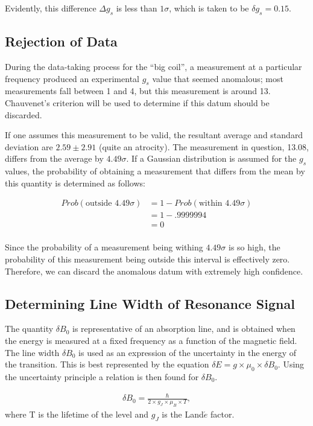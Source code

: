 \documentclass[a4paper]{article}
\begin{document}
Evidently, this difference $\Delta g_s$ is less than $1 \sigma$, which is taken to be $\delta g_s = 0.15$.

\subsection{Rejection of Data}
\qq During the data-taking process for the ``big coil'', a measurement
at a particular frequency produced an experimental $g_s$ value that
seemed anomalous; most measurements fall between 1 and 4, but this
measurement is around 13. Chauvenet's criterion will be used to
determine if this datum should be discarded.

\qq If one assumes this measurement to be valid, the resultant average
and standard deviation are $2.59 \pm 2.91$ (quite an atrocity). The
measurement in question, 13.08, differs from the average by $4.49
\sigma$. If a Gaussian distribution is assumed for the $g_s$ values,
the probability of obtaining a measurement that differs from the mean
by this quantity is determined as follows:

\begin{align*}
Prob(\text{outside }  4.49 \sigma) &= 1 - Prob(\text{within } 4.49 \sigma) \\
							  &= 1 -  .9999994 \\
							  &= 0 \\
\end{align*}

\qq Since the probability of a measurement being withing $4.49 \sigma$
is so high, the probability of this measurement being outside this
interval is effectively zero. Therefore, we can discard the anomalous
datum with extremely high confidence.

\subsection{Determining Line Width of Resonance Signal}
\qq The quantity $\delta B_0$ is representative of an absorption line, and is
obtained when the energy is measured at a fixed frequency as a function
of the magnetic field. The line width $\delta B_0$ is used as an
expression of the uncertainty in the energy of the transition. This is
best represented by the equation $\delta E = g \times \mu_0 \times
\delta B_0$. Using the uncertainty principle a relation is then found
for $\delta B_0$.

\begin{align*}
\delta B_0 = \frac{\hbar}{2 \times g_J \times \mu_B \times T},
\end{align*}
where T is the lifetime of the level and $g_J$ is the Land$\acute{e}$
factor.
\end{document}
